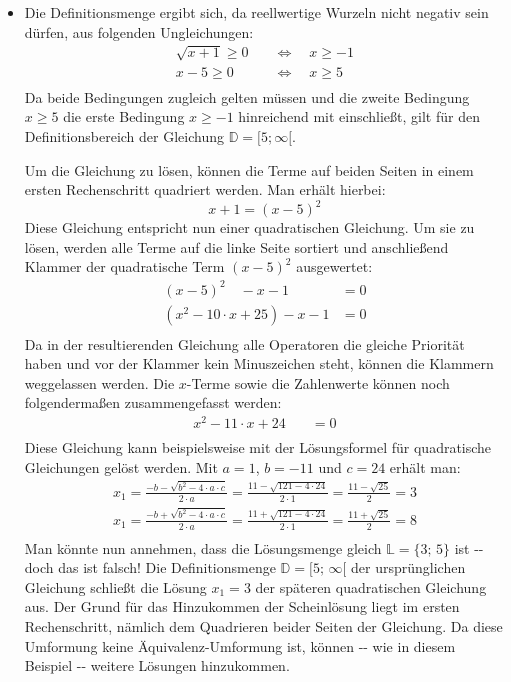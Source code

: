 \documentclass[a4paper]{article}
\begin{document}
%
\begin{itemize}

\item Die Definitionsmenge ergibt sich, da reellwertige Wurzeln nicht negativ sein
dürfen, aus folgenden Ungleichungen:
%
\begin{align*}
\sqrt{x + 1} \ge 0 \quad &\Longleftrightarrow \quad x \ge -1 \\
x - 5 \ge 0 \quad &\Longleftrightarrow \quad x \ge 5 \\
\end{align*}
Da beide Bedingungen zugleich gelten müssen und die zweite Bedingung $x
\ge 5$ die erste Bedingung $x \ge -1$ hinreichend mit einschließt, gilt
für den Definitionsbereich der Gleichung $\mathbb{D} = [5; \infty[$.

Um die Gleichung zu lösen, können die Terme auf beiden Seiten in einem ersten
Rechenschritt quadriert werden. Man erhält hierbei:
%
\begin{equation*}
x + 1 = (x - 5)^2
\end{equation*}
Diese Gleichung entspricht nun einer quadratischen Gleichung. Um sie zu lösen,
werden alle Terme auf die linke Seite sortiert und anschließend Klammer der
quadratische Term $(x-5)^2$ ausgewertet:
%
\begin{align*}
(x-5)^2 \quad - x - 1 &= 0 \\
(x^2 - 10 \cdot x + 25) - x - 1 &= 0 \\
\end{align*}
Da in der resultierenden Gleichung alle Operatoren die gleiche Priorität haben
und vor der Klammer kein Minuszeichen steht, können die Klammern weggelassen
werden. Die $x$-Terme sowie die Zahlenwerte können noch folgendermaßen
zusammengefasst werden:
%
\begin{align*}
x^2 - 11 \cdot x + 24 \quad  &= 0 \\
\end{align*}
Diese Gleichung kann beispielsweise mit der Lösungsformel für quadratische
Gleichungen gelöst werden. Mit $a=1$, $b=-11$ und $c=24$
erhält man:
%
\begin{align*}
x_1 = \frac{-b - \sqrt{b^2 - 4 \cdot a \cdot c}}{2 \cdot a} = \frac{11 -
\sqrt{121 - 4 \cdot 24}}{2 \cdot 1} = \frac{11 - \sqrt{25}}{2} = 3\\
x_1 = \frac{-b + \sqrt{b^2 - 4 \cdot a \cdot c}}{2 \cdot a} = \frac{11 +
\sqrt{121 - 4 \cdot 24}}{2 \cdot 1} = \frac{11 + \sqrt{25}}{2} = 8\\
\end{align*}
Man könnte nun annehmen, dass die Lösungsmenge gleich $\mathbb{L} = \{
3;\,5 \}$ ist -{}- doch das ist falsch! Die Definitionsmenge $\mathbb{D} =
[5;\,\infty[$ der ursprünglichen Gleichung schließt die Lösung $x_1 = 3$
der späteren quadratischen Gleichung aus. Der Grund für das Hinzukommen der
\textquotedbl{}Scheinlösung\textquotedbl{} liegt im ersten Rechenschritt, nämlich dem Quadrieren beider
Seiten der Gleichung. Da diese Umformung keine Äquivalenz-Umformung ist,
können -{}- wie in diesem Beispiel -{}- weitere Lösungen hinzukommen.


\end{itemize}
\end{document}
